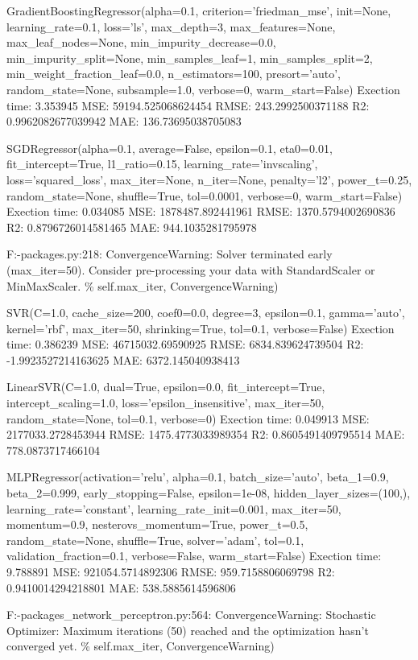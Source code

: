 \documentclass[11pt]{article}
\begin{document}
GradientBoostingRegressor(alpha=0.1, criterion='friedman\_mse',
init=None, learning\_rate=0.1, loss='ls', max\_depth=3,
max\_features=None, max\_leaf\_nodes=None, min\_impurity\_decrease=0.0,
min\_impurity\_split=None, min\_samples\_leaf=1, min\_samples\_split=2,
min\_weight\_fraction\_leaf=0.0, n\_estimators=100, presort='auto',
random\_state=None, subsample=1.0, verbose=0, warm\_start=False)
Exection time: 3.353945 MSE: 59194.525068624454 RMSE: 243.2992500371188
R2: 0.9962082677039942 MAE: 136.73695038705083

SGDRegressor(alpha=0.1, average=False, epsilon=0.1, eta0=0.01,
fit\_intercept=True, l1\_ratio=0.15, learning\_rate='invscaling',
loss='squared\_loss', max\_iter=None, n\_iter=None, penalty='l2',
power\_t=0.25, random\_state=None, shuffle=True, tol=0.0001, verbose=0,
warm\_start=False) Exection time: 0.034085 MSE: 1878487.892441961 RMSE:
1370.5794002690836 R2: 0.8796726014581465 MAE: 944.1035281795978

F:\Users\ncksd{}\lib\site-packages\sklearn\svm\base.py:218:
ConvergenceWarning: Solver terminated early (max\_iter=50). Consider
pre-processing your data with StandardScaler or MinMaxScaler. \%
self.max\_iter, ConvergenceWarning)

SVR(C=1.0, cache\_size=200, coef0=0.0, degree=3, epsilon=0.1,
gamma='auto', kernel='rbf', max\_iter=50, shrinking=True, tol=0.1,
verbose=False) Exection time: 0.386239 MSE: 46715032.69590925 RMSE:
6834.839624739504 R2: -1.9923527214163625 MAE: 6372.145040938413

LinearSVR(C=1.0, dual=True, epsilon=0.0, fit\_intercept=True,
intercept\_scaling=1.0, loss='epsilon\_insensitive', max\_iter=50,
random\_state=None, tol=0.1, verbose=0) Exection time: 0.049913 MSE:
2177033.2728453944 RMSE: 1475.4773033989354 R2: 0.8605491409795514 MAE:
778.0873717466104

MLPRegressor(activation='relu', alpha=0.1, batch\_size='auto',
beta\_1=0.9, beta\_2=0.999, early\_stopping=False, epsilon=1e-08,
hidden\_layer\_sizes=(100,), learning\_rate='constant',
learning\_rate\_init=0.001, max\_iter=50, momentum=0.9,
nesterovs\_momentum=True, power\_t=0.5, random\_state=None,
shuffle=True, solver='adam', tol=0.1, validation\_fraction=0.1,
verbose=False, warm\_start=False) Exection time: 9.788891 MSE:
921054.5714892306 RMSE: 959.7158806069798 R2: 0.9410014294218801 MAE:
538.5885614596806

F:\Users\ncksd{}\lib\site-packages\sklearn\neural\_network\multilayer\_perceptron.py:564:
ConvergenceWarning: Stochastic Optimizer: Maximum iterations (50)
reached and the optimization hasn't converged yet. \% self.max\_iter,
ConvergenceWarning)
\end{document}
